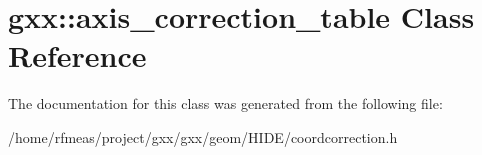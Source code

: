 \hypertarget{classgxx_1_1axis__correction__table}{}\section{gxx\+:\+:axis\+\_\+correction\+\_\+table Class Reference}
\label{classgxx_1_1axis__correction__table}


The documentation for this class was generated from the following file\+:\begin{DoxyCompactItemize}
\item 
/home/rfmeas/project/gxx/gxx/geom/\+H\+I\+D\+E/coordcorrection.\+h\end{DoxyCompactItemize}
